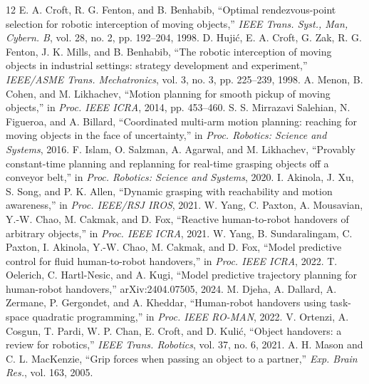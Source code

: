 \documentclass[conference]{IEEEtran}
\begin{document}
\begin{thebibliography}{12}
 E. A. Croft, R. G. Fenton, and B. Benhabib, ``Optimal rendezvous-point selection for robotic interception of moving objects,'' \emph{IEEE Trans. Syst., Man, Cybern. B}, vol. 28, no. 2, pp. 192--204, 1998.
 D. Huji\'c, E. A. Croft, G. Zak, R. G. Fenton, J. K. Mills, and B. Benhabib, ``The robotic interception of moving objects in industrial settings: strategy development and experiment,'' \emph{IEEE/ASME Trans. Mechatronics}, vol. 3, no. 3, pp. 225--239, 1998.
 A. Menon, B. Cohen, and M. Likhachev, ``Motion planning for smooth pickup of moving objects,'' in \emph{Proc. IEEE ICRA}, 2014, pp. 453--460.
 S. S. Mirrazavi Salehian, N. Figueroa, and A. Billard, ``Coordinated multi-arm motion planning: reaching for moving objects in the face of uncertainty,'' in \emph{Proc. Robotics: Science and Systems}, 2016.
 F. Islam, O. Salzman, A. Agarwal, and M. Likhachev, ``Provably constant-time planning and replanning for real-time grasping objects off a conveyor belt,'' in \emph{Proc. Robotics: Science and Systems}, 2020.
 I. Akinola, J. Xu, S. Song, and P. K. Allen, ``Dynamic grasping with reachability and motion awareness,'' in \emph{Proc. IEEE/RSJ IROS}, 2021.
 W. Yang, C. Paxton, A. Mousavian, Y.-W. Chao, M. Cakmak, and D. Fox, ``Reactive human-to-robot handovers of arbitrary objects,'' in \emph{Proc. IEEE ICRA}, 2021.
 W. Yang, B. Sundaralingam, C. Paxton, I. Akinola, Y.-W. Chao, M. Cakmak, and D. Fox, ``Model predictive control for fluid human-to-robot handovers,'' in \emph{Proc. IEEE ICRA}, 2022.
 T. Oelerich, C. Hartl-Nesic, and A. Kugi, ``Model predictive trajectory planning for human-robot handovers,'' arXiv:2404.07505, 2024.
 M. Djeha, A. Dallard, A. Zermane, P. Gergondet, and A. Kheddar, ``Human-robot handovers using task-space quadratic programming,'' in \emph{Proc. IEEE RO-MAN}, 2022.
 V. Ortenzi, A. Cosgun, T. Pardi, W. P. Chan, E. Croft, and D. Kuli\'c, ``Object handovers: a review for robotics,'' \emph{IEEE Trans. Robotics}, vol. 37, no. 6, 2021.
 A. H. Mason and C. L. MacKenzie, ``Grip forces when passing an object to a partner,'' \emph{Exp. Brain Res.}, vol. 163, 2005.
\end{thebibliography}
\end{document}
